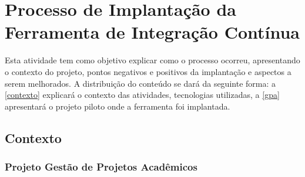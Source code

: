 \section{Processo de Implantação da Ferramenta de Integração Contínua}
Esta atividade tem como objetivo explicar como o processo ocorreu, apresentando o contexto do projeto, pontos negativos e positivos da implantação e aspectos a serem melhorados. A distribuição do conteúdo se dará da seguinte forma: a \autoref{contexto} explicará o contexto das atividades, tecnologias utilizadas, a \autoref{gpa} apresentará o projeto piloto onde a ferramenta foi implantada.

\subsection{Contexto}\label{contexto}

\subsubsection{Projeto Gestão de Projetos Acadêmicos }\label{gpa}